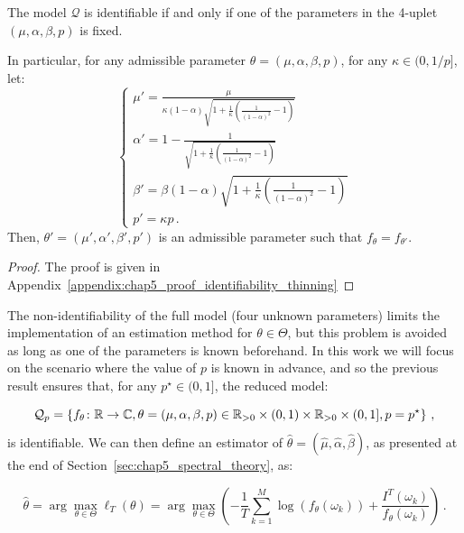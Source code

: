     \begin{proposition}\label{prop:chap5_identifiability_thinning}
        The model $\mathcal{Q}$ is identifiable if and only if one of the parameters in the 4-uplet $(\mu, \alpha, \beta, p)$ is fixed.

        In particular, for any admissible parameter $\theta = (\mu, \alpha, \beta, p)$,
        for any $\kappa\in(0, 1/p]$, let:
        \begin{equation}\label{eq:chap5_nonidentifiable_parameters}
        \begin{cases}
            \mu' = \frac{\mu}{\kappa(1-\alpha)\sqrt{1 + \frac{1}{\kappa}\left(\frac{1}{(1-\alpha)^2} - 1\right)}}\\
            \alpha' = 1 - \frac{1}{\sqrt{1 + \frac{1}{\kappa}\left(\frac{1}{(1-\alpha)^2} - 1\right)}}\\
            \beta' = \beta (1-\alpha) \sqrt{1 + \frac{1}{\kappa}\left(\frac{1}{(1-\alpha)^2} - 1\right)}\\
            p' = \kappa p\,.
          \end{cases}
        \end{equation}
          Then, $\theta' = (\mu', \alpha', \beta', p')$ is an admissible parameter such that $f_{\theta} = f_{\theta'}$.
    \end{proposition}

    \begin{proof}
        The proof is given in Appendix~\ref{appendix:chap5_proof_identifiability_thinning}
    \end{proof}

    The non-identifiability of the full model (four unknown parameters) limits the implementation of an estimation method for $\theta\in\Theta$, but this problem is avoided as long as one of the parameters is known beforehand. 
    In this work we will focus on the scenario where the value of $p$ is known in advance, 
    and so the previous result ensures that, for any $p^\star\in(0,1]$, the reduced model:
    
    \[\mathcal{Q}_{p} = 
        \left\{
            f_\theta \colon {\mathbb R} \to {\mathbb C}, 
            \theta = (\mu, \alpha, \beta, p) \in {\mathbb R}_{>0}\times (0,1) \times {\mathbb R}_{>0}\times(0,1], p=p^\star
        \right\}\,,
    \]
    is identifiable.
    We can then define an estimator of $\hat \theta = (\hat \mu, \hat \alpha, \hat \beta)$, as presented at the end of Section~\ref{sec:chap5_spectral_theory}, as:

    \[
        \hat \theta = \arg\max_{\theta \in \Theta} \ell_T (\theta)
        = \arg\max_{\theta \in \Theta}  \left(-\frac{1}{T}\sum_{k=1}^{M}{\log(f_\theta (\omega_k)) + \frac{I^T(\omega_k)}{f_\theta(\omega_k)}}\right)\,.
    \]

